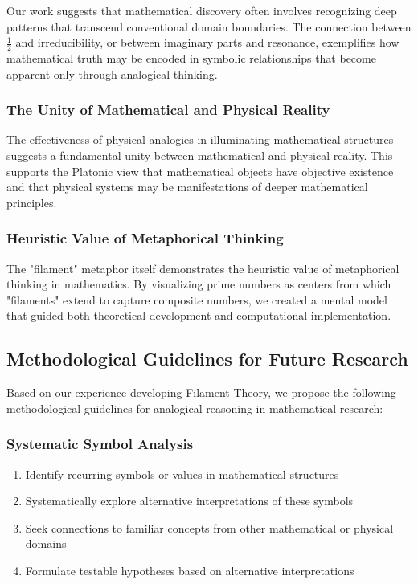 Our work suggests that mathematical discovery often involves recognizing deep patterns that transcend conventional domain boundaries. The connection between $\frac{1}{2}$ and irreducibility, or between imaginary parts and resonance, exemplifies how mathematical truth may be encoded in symbolic relationships that become apparent only through analogical thinking.

\subsubsection{The Unity of Mathematical and Physical Reality}

The effectiveness of physical analogies in illuminating mathematical structures suggests a fundamental unity between mathematical and physical reality. This supports the Platonic view that mathematical objects have objective existence and that physical systems may be manifestations of deeper mathematical principles.

\subsubsection{Heuristic Value of Metaphorical Thinking}

The "filament" metaphor itself demonstrates the heuristic value of metaphorical thinking in mathematics. By visualizing prime numbers as centers from which "filaments" extend to capture composite numbers, we created a mental model that guided both theoretical development and computational implementation.

\subsection{Methodological Guidelines for Future Research}

Based on our experience developing Filament Theory, we propose the following methodological guidelines for analogical reasoning in mathematical research:

\subsubsection{Systematic Symbol Analysis}

\begin{guideline}
\begin{enumerate}
\item Identify recurring symbols or values in mathematical structures
\item Systematically explore alternative interpretations of these symbols
\item Seek connections to familiar concepts from other mathematical or physical domains
\item Formulate testable hypotheses based on alternative interpretations
\end{enumerate}
\end{guideline}

